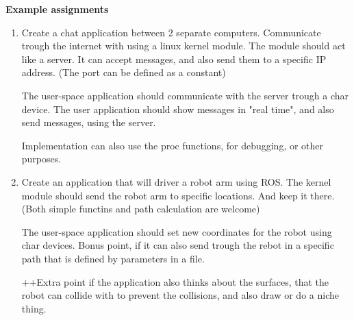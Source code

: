 \documentclass[12pt,a4paper]{article}
\author{Korcsák Gergely}
\begin{document}
    \renewcommand{\thelstlisting}{\arabic{section}.\arabic{lstlisting}}
    \renewcommand{\lstlistoflistings}{\begingroup
        \tocfile{Code snippets}{lol}
    \endgroup}

    \setcounter{page}{1} %
    \setalgorithmcounter %


    {
        \centering
        \Large
        \textbf{Example assignments}
        \hline
        \vspace{1em}
    }

    \begin{enumerate}
        \item Create a chat application between 2 separate computers. Communicate trough the internet with using a linux
            kernel module. The module should act like a server. It can accept messages, and also send them to a specific
            IP address. (The port can be defined as a constant)

            The user-space application should communicate with the server trough a char device.
            The user application should show messages in "real time", and also send messages, using the server.

            Implementation can also use the proc functions, for debugging, or other purposes.

        \item Create an application that will driver a robot arm using ROS. The kernel module should send the robot arm
            to specific locations. And keep it there. (Both simple functins and path calculation are welcome)

            The user-space application should set new coordinates for the robot using char devices.
            Bonus point, if it can also send trough the rebot in a specific path that is defined by parameters in a file.

            ++Extra point if the application also thinks about the surfaces, that the robot can collide with to prevent
            the collisions, and also draw or do a niche thing.
    \end{enumerate}
\end{document}
